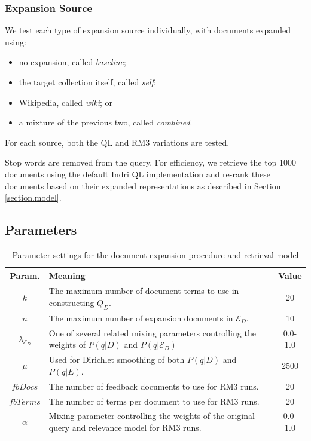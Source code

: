 \documentclass{sig-alternate}
\begin{document}
\subsubsection{Expansion Source}\label{section.evaluation.runs.expansion}

We test each type of expansion source individually, with documents expanded using:
\begin{itemize}
	\item no expansion, called \textit{baseline};
	\item the target collection itself, called \textit{self};
	\item Wikipedia, called \textit{wiki}; or
	\item a mixture of the previous two, called \textit{combined}.
\end{itemize}

\noindent For each source, both the QL and RM3 variations are tested.

Stop words are removed from the query. For efficiency, we retrieve the top 1000 documents using the default Indri QL implementation and re-rank these documents based on their expanded representations as described in Section \ref{section.model}.

\subsection{Parameters}\label{section.evaluation.parameters}

\begin{table}[htb]
\centering
\begin{tabular}{|c|p{}|c|} \hline
{\bf Param.} & {\bf Meaning} & {\bf Value} \\ \hline
$k$ & The maximum number of document terms to use in constructing $Q_D$. & 20 \\ \hline
$n$ & The maximum number of expansion documents in $\mathcal{E}_D$. & 10 \\ \hline
$\lambda_{\mathcal{E}_D}$ & One of several related mixing parameters controlling the weights of $P(q|D)$ and $P(q|\mathcal{E}_D)$ & 0.0-1.0 \\ \hline
$\mu$ & Used for Dirichlet smoothing of both $P(q|D)$ and $P(q|E)$. & 2500 \\ \hline
$fbDocs$ & The number of feedback documents to use for RM3 runs. & 20 \\ \hline
$fbTerms$ & The number of terms per document to use for RM3 runs. & 20 \\ \hline
$\alpha$ & Mixing parameter controlling the weights of the original query and relevance model for RM3 runs. & 0.0-1.0 \\ \hline
\end{tabular}
\caption{Parameter settings for the document expansion procedure and retrieval model}
\label{table.parameters}
\end{table}
\end{document}
